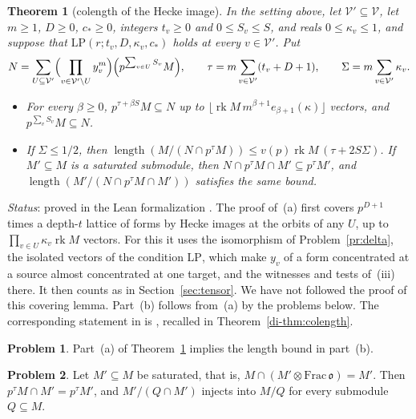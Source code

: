 \documentclass[reqno]{amsart}
\theoremstyle{definition}
\newtheorem{problem}{Problem}[section]
\theoremstyle{plain}
\newtheorem{theorem}{Theorem}[section]
\theoremstyle{remark}
\newcommand{\LP}{\mathrm{LP}}
\newcommand{\rk}{\operatorname{rk}}
\newcommand{\len}{\operatorname{length}}
\newcommand{\vo}{\mathfrak o}
\newcommand{\Vc}{\mathcal V}
\begin{document}
\begin{theorem}[colength of the Hecke image]\label{thm:colength}
In the setting above, let \(\Vc'\subseteq\Vc\), let \(m\ge1\), \(D\ge0\), \(c_*\ge0\), integers \(t_v\ge0\) and \(0\le S_v\le S\), and reals \(0\le\kappa_v\le1\), and suppose that \(\LP(r;t_v,D,\kappa_v,c_*)\) holds at every \(v\in\Vc'\).  Put
\[
 N=\sum_{U\subseteq\Vc'}\Bigl(\prod_{v\in\Vc'\setminus U}y_v^m\Bigr)\Bigl(p^{\sum_{v\in U}S_v}M\Bigr),\qquad \tau=m\sum_{v\in\Vc'}(t_v+D+1),\qquad \Sigma=m\sum_{v\in\Vc'}\kappa_v .
\]
\begin{itemize}
\item[(a)] For every \(\beta\ge0\), \(p^{\tau+\beta S}M\subseteq N\) up to \(\lfloor\rk M\,m^{\beta+1}e_{\beta+1}(\kappa)\rfloor\) vectors, and \(p^{\sum_vS_v}M\subseteq N\).
\item[(b)] If \(\Sigma\le1/2\), then \(\len(M/(N\cap p^\tau M))\le v(p)\rk M\,(\tau+2S\Sigma)\).  If \(M'\subseteq M\) is a saturated submodule, then \(N\cap p^\tau M\cap M'\subseteq p^\tau M'\), and \(\len(M'/(N\cap p^\tau M\cap M'))\) satisfies the same bound.
\end{itemize}
\end{theorem}

\noindent\emph{Status}: proved in the Lean formalization \cite{Lean}.  The proof of~(a) first covers \(p^{D+1}\) times a depth-\(t\) lattice of forms by Hecke images at the orbits of any \(U\), up to \(\prod_{v\in U}\kappa_v\rk M\) vectors.  For this it uses the isomorphism of Problem~\ref{pr:delta}, the isolated vectors of the condition \(\LP\), which make \(y_v\) of a form concentrated at a source almost concentrated at one target, and the witnesses and tests of~(iii) there.  It then counts as in Section~\ref{sec:tensor}.  We have not followed the proof of this covering lemma.  Part~(b) follows from~(a) by the problems below.  The corresponding statement in \cite{Adr} is \cite[Thm.~12.18]{Adr}, recalled in Theorem~\ref{di-thm:colength}.

\begin{problem}\label{pr:a-to-b}
Part~(a) of Theorem~\ref{thm:colength} implies the length bound in part~(b).
\end{problem}

\begin{problem}\label{pr:saturated}
Let \(M'\subseteq M\) be saturated, that is, \(M\cap(M'\otimes\mathrm{Frac}\,\vo)=M'\).  Then \(p^\tau M\cap M'=p^\tau M'\), and \(M'/(Q\cap M')\) injects into \(M/Q\) for every submodule \(Q\subseteq M\).
\end{problem}
\end{document}

